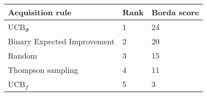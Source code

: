 \begin{tabular}{lll}
Acquisition rule & Rank & Borda score \\ 
\hline 
UCB$_\Phi$                                    & 1 & 24 \\ 
Binary Expected Improvement \citep{Tesch2013} & 2 & 20 \\ 
Random                                        & 3 & 15 \\ 
Thompson sampling                             & 4 & 11 \\ 
UCB$_f$ \citep{Tesch2013}                     & 5 & 3 \\ 
\hline 
\end{tabular}